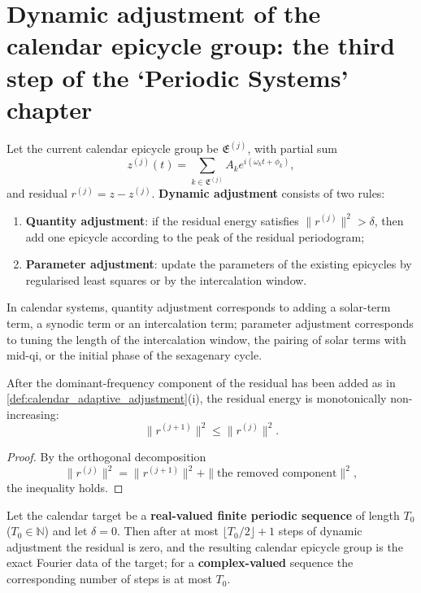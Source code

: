 \section{Dynamic adjustment of the calendar epicycle group: the third step of the `Periodic Systems' chapter}
\label{sec:calendar_adaptive}

\begin{definition}\label{def:calendar_adaptive_adjustment}
Let the current calendar epicycle group be \(\mathfrak E^{(j)}\), with partial sum
\[
z^{(j)}(t)=\sum_{k\in\mathfrak E^{(j)}}A_k e^{i(\omega_k t+\phi_k)},
\]
and residual \(r^{(j)}=z-z^{(j)}\). \textbf{Dynamic adjustment} consists of two rules:
\begin{enumerate}[label=(\roman*)]
    \item \textbf{Quantity adjustment}: if the residual energy satisfies \(\|r^{(j)}\|^2>\delta\), then add one epicycle according to the peak of the residual periodogram;
    \item \textbf{Parameter adjustment}: update the parameters of the existing epicycles by regularised least squares or by the intercalation window.
\end{enumerate}
In calendar systems, quantity adjustment corresponds to adding a solar-term term, a synodic term or an intercalation term; parameter adjustment corresponds to tuning the length of the intercalation window, the pairing of solar terms with mid-qi, or the initial phase of the sexagenary cycle.
\end{definition}

\begin{proposition}\label{prop:calendar_adaptive_growth}
After the dominant-frequency component of the residual has been added as in \cref{def:calendar_adaptive_adjustment}(i), the residual energy is monotonically non-increasing:
\[
\|r^{(j+1)}\|^2\le\|r^{(j)}\|^2.
\]
\end{proposition}

\begin{proof}
By the orthogonal decomposition
\[
\|r^{(j)}\|^2=\|r^{(j+1)}\|^2+\|\text{the removed component}\|^2,
\]
the inequality holds.
\end{proof}

\begin{theorem}\label{thm:calendar_adaptive_convergence}
Let the calendar target be a \textbf{real-valued finite periodic sequence} of length $T_0$ ($T_0\in\mathbb N$) and let $\delta=0$. Then after at most $\lfloor T_0/2\rfloor+1$ steps of dynamic adjustment the residual is zero, and the resulting calendar epicycle group is the exact Fourier data of the target; for a \textbf{complex-valued} sequence the corresponding number of steps is at most $T_0$.
\end{theorem}

